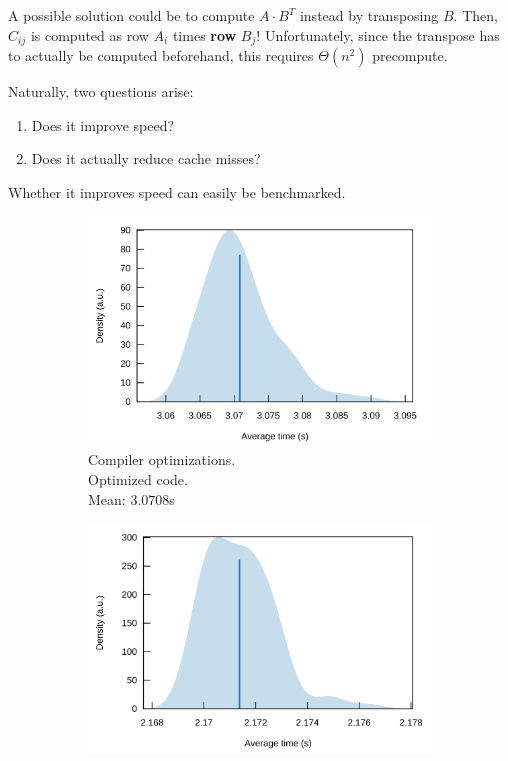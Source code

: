 A possible solution could be to compute $A \cdot B^T$ instead by transposing $B$. Then, $C_{ij}$ is computed as row $A_i$ times \textbf{row} $B_j$! Unfortunately, since the transpose has to actually be computed beforehand, this requires $\Theta(n^2)$ precompute.

Naturally, two questions arise:
\begin{enumerate}
  \item Does it improve speed?
  \item Does it actually reduce cache misses?
\end{enumerate}

Whether it improves speed can easily be benchmarked.

\begin{figure}[H]
\centering
\begin{subfigure}{.5\textwidth}
  \centering
  \includegraphics[width=\linewidth]{./assets/compiler_optimized.png}
  \caption{Compiler optimizations.\\\hspace*{0.6cm}Optimized code.\\\hspace*{0.6cm}Mean: $3.0708$s}
\end{subfigure}%
\begin{subfigure}{.5\textwidth}
  \centering
  \includegraphics[width=\linewidth]{./assets/compiler_optimized_transposed.png}

\end{subfigure}
\end{figure}

